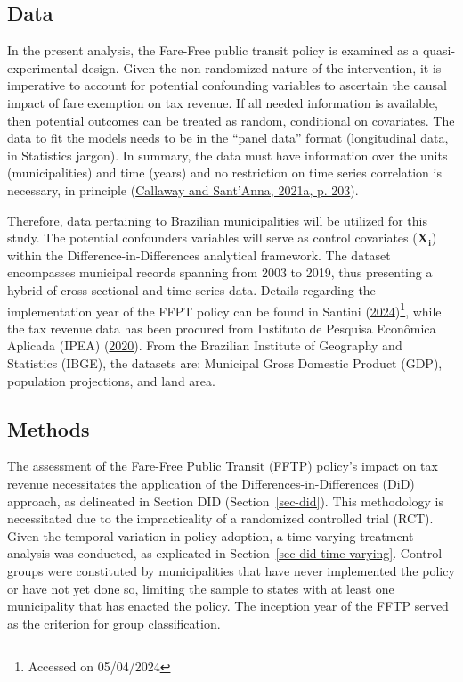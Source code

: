 \documentclass[12pt, a4paper, twoside]{article}
\numberwithin{equation}{subsection} %
\begin{document}
\hypertarget{sec-data}{%
\subsection{Data}\label{sec-data}}

In the present analysis, the Fare-Free public transit policy is examined
as a quasi-experimental design. Given the non-randomized nature of the
intervention, it is imperative to account for potential confounding
variables to ascertain the causal impact of fare exemption on tax
revenue. If all needed information is available, then potential outcomes
can be treated as random, conditional on covariates. The data to fit the
models needs to be in the ``panel data'' format (longitudinal data, in
Statistics jargon). In summary, the data must have information over the
units (municipalities) and time (years) and no restriction on time
series correlation is necessary, in principle
(\protect\hyperlink{ref-CALLAWAY2021200}{Callaway and Sant'Anna, 2021a,
p. 203}).

Therefore, data pertaining to Brazilian municipalities will be utilized
for this study. The potential confounders variables will serve as
control covariates (\(\boldsymbol{X_i}\)) within the
Difference-in-Differences analytical framework. The dataset encompasses
municipal records spanning from 2003 to 2019, thus presenting a hybrid
of cross-sectional and time series data. Details regarding the
implementation year of the FFPT policy can be found in Santini
(\protect\hyperlink{ref-Santini-FFPT-2024}{2024})\footnote{Accessed on
  05/04/2024}, while the tax revenue data has been procured from
Instituto de Pesquisa Econômica Aplicada (IPEA)
(\protect\hyperlink{ref-IPEA-iss-2020}{2020}). From the Brazilian
Institute of Geography and Statistics (IBGE), the datasets are:
Municipal Gross Domestic Product (GDP), population projections, and land
area.

\hypertarget{sec-methods}{%
\subsection{Methods}\label{sec-methods}}

The assessment of the Fare-Free Public Transit (FFTP) policy's impact on
tax revenue necessitates the application of the
Differences-in-Differences (DiD) approach, as delineated in Section DID
(Section~\ref{sec-did}). This methodology is necessitated due to the
impracticality of a randomized controlled trial (RCT). Given the
temporal variation in policy adoption, a time-varying treatment analysis
was conducted, as explicated in Section~\ref{sec-did-time-varying}.
Control groups were constituted by municipalities that have never
implemented the policy or have not yet done so, limiting the sample to
states with at least one municipality that has enacted the policy. The
inception year of the FFTP served as the criterion for group
classification.
\end{document}
